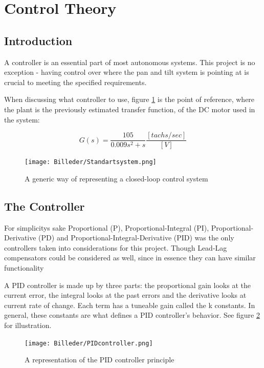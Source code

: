 \newpage

\section{Control Theory}
\subsection{Introduction}
A controller is an essential part of most autonomous systems. This project is no exception - having control over where the pan and tilt system is pointing at is crucial to meeting the specified requirements.

When discussing what controller to use, figure \ref{fig:Standartsystem} is the point of reference, where the plant is the previously estimated transfer function, of the DC motor used in the system:

\begin{equation}
G(s)=\frac{105}{0.009s^2+s} \frac{[tachs/sec]}{[V]}
\end{equation}

\begin{figure}[h!]
\centering
\texttt{[image: Billeder/Standartsystem.png]}
\caption{ A generic way of representing a closed-loop control system }
\label{fig:Standartsystem}
\end{figure}

\newpage

\subsection{The Controller}
For simplicitys sake Proportional (P), Proportional-Integral (PI), Proportional-Derivative (PD) and Proportional-Integral-Derivative (PID) was the only controllers taken into considerations for this project. Though Lead-Lag compensators could be considered as well, since in essence they can have similar functionality\par

A PID controller is made up by three parts: the proportional gain looks at the current error, the integral looks at the past errors and the derivative looks at current rate of change. Each term has a tuneable gain called the k constants. In general, these constants are what defines a PID controller’s behavior. See figure \ref{fig:PID controller} for illustration. 

\begin{figure}[h!]
\centering
\texttt{[image: Billeder/PIDcontroller.png]}
\caption{ A representation of the PID controller principle }
\label{fig:PID controller}
\end{figure}

